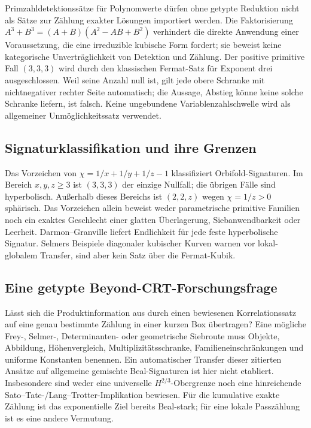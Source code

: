 \documentclass[11pt,a4paper]{article}
\begin{document}
Primzahldetektionssätze für Polynomwerte
\cite{FI1998a,FI1998b,HB2001,HBMoroz2002,Merikoski2022}
dürfen ohne getypte Reduktion nicht als Sätze zur Zählung exakter
Lösungen importiert werden. Die Faktorisierung
$A^3+B^3=(A+B)(A^2-AB+B^2)$ verhindert die direkte Anwendung
einer Voraussetzung, die eine irreduzible kubische Form fordert;
sie beweist keine kategorische Unverträglichkeit von Detektion
und Zählung.
Der positive primitive Fall $(3,3,3)$ wird durch den klassischen
Fermat-Satz für Exponent drei ausgeschlossen. Weil seine Anzahl
null ist, gilt jede obere Schranke mit nichtnegativer rechter Seite
automatisch; die Aussage, Abstieg könne keine solche Schranke
liefern, ist falsch.
Keine ungebundene Variablenzahlschwelle wird als allgemeiner
Unmöglichkeitssatz verwendet.

\subsection{Signaturklassifikation und ihre Grenzen}
\label{sec:outlook-phase}

Das Vorzeichen von $\chi=1/x+1/y+1/z-1$ klassifiziert
Orbifold-Signaturen. Im Bereich $x,y,z\ge3$ ist $(3,3,3)$
der einzige Nullfall; die übrigen Fälle sind hyperbolisch.
Außerhalb dieses Bereichs ist $(2,2,z)$ wegen $\chi=1/z>0$
sphärisch. Das Vorzeichen allein beweist weder parametrische
primitive Familien noch ein exaktes Geschlecht einer glatten
Überlagerung, Siebanwendbarkeit oder Leerheit.
Darmon--Granville liefert Endlichkeit für jede feste hyperbolische
Signatur. Selmers Beispiele diagonaler kubischer Kurven
\cite{Selmer1951} warnen vor lokal-globalem Transfer, sind aber
kein Satz über die Fermat-Kubik.

\subsection{Eine getypte Beyond-CRT-Forschungsfrage}
\label{sec:outlook-rqprime}

Lässt sich die Produktinformation aus 
durch einen bewiesenen Korrelationssatz auf eine genau bestimmte
Zählung in einer kurzen Box übertragen?
Eine mögliche Frey-, Selmer-, Determinanten- oder geometrische
Siebroute \cite{BS2015,Bhargava2014,HeathBrown2002,KoymansSmith2024}
muss Objekte, Abbildung, Höhenvergleich, Multiplizitätsschranke,
Familieneinschränkungen und uniforme Konstanten benennen.
Ein automatischer Transfer dieser zitierten Ansätze auf allgemeine
gemischte Beal-Signaturen ist hier nicht etabliert.
Insbesondere sind weder eine universelle $H^{2/3}$-Obergrenze
noch eine hinreichende Sato--Tate-/Lang--Trotter-Implikation bewiesen.
Für die kumulative exakte Zählung ist das exponentielle Ziel
bereits Beal-stark; für eine lokale Passzählung ist es eine
andere Vermutung.
\end{document}
